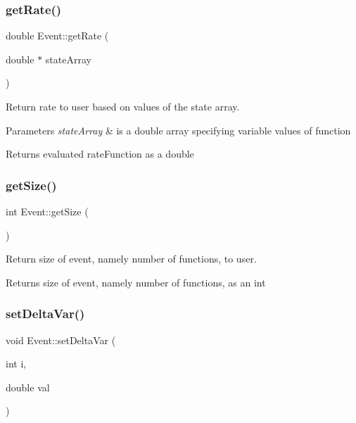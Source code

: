 \subsubsection{\texorpdfstring{get\+Rate()}{getRate()}}
{\footnotesize\ttfamily double Event\+::get\+Rate (\begin{DoxyParamCaption}\item[{double $\ast$}]{state\+Array }\end{DoxyParamCaption})}



Return rate to user based on values of the state array. 


\begin{DoxyParams}{Parameters}
{\em state\+Array} & is a double array specifying variable values of function \\
\hline
\end{DoxyParams}
\begin{DoxyReturn}{Returns}
evaluated rate\+Function as a double 
\end{DoxyReturn}
\mbox{\label{class_event_a1a0f2e2dc0b203f7be0f1d5b8810c6a2}} 
\subsubsection{\texorpdfstring{get\+Size()}{getSize()}}
{\footnotesize\ttfamily int Event\+::get\+Size (\begin{DoxyParamCaption}{ }\end{DoxyParamCaption})}



Return size of event, namely number of functions, to user. 

\begin{DoxyReturn}{Returns}
size of event, namely number of functions, as an int 
\end{DoxyReturn}
\mbox{\label{class_event_a980f39895f2afc1c2273d921d92aeac0}} 
\subsubsection{\texorpdfstring{set\+Delta\+Var()}{setDeltaVar()}}
{\footnotesize\ttfamily void Event\+::set\+Delta\+Var (\begin{DoxyParamCaption}\item[{int}]{i,  }\item[{double}]{val }\end{DoxyParamCaption})}



